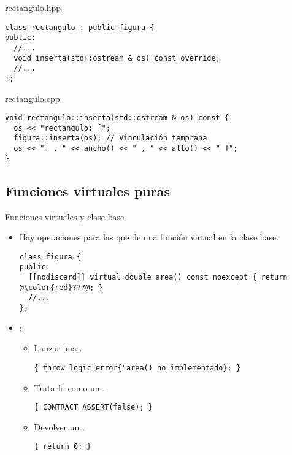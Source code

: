 \begin{frame}[t,fragile]
\begin{block}{rectangulo.hpp}
\begin{lstlisting}
class rectangulo : public figura {
public:
  //...
  void inserta(std::ostream & os) const override;
  //...  
};
\end{lstlisting}
\end{block}

\begin{block}{rectangulo.cpp}
\begin{lstlisting}
void rectangulo::inserta(std::ostream & os) const {
  os << "rectangulo: [";
  figura::inserta(os); // Vinculación temprana
  os << "] , " << ancho() << " , " << alto() << " ]";
}
\end{lstlisting}
\end{block}
\end{frame}

\subsection{Funciones virtuales puras}

\begin{frame}[t,fragile]{Funciones virtuales y clase base} 
\begin{itemize}
  \item Hay operaciones para las que 
        de una función virtual en la clase base.
\begin{lstlisting}[escapechar=@]
class figura {
public:
  [[nodiscard]] virtual double area() const noexcept { return @\color{red}???@; }
  //...
};
\end{lstlisting}

  \item {}:
    \begin{itemize}
      \item Lanzar una .
\begin{lstlisting}
{ throw logic_error{"area() no implementado}; }
\end{lstlisting}

      \item Tratarlo como un .
\begin{lstlisting}
{ CONTRACT_ASSERT(false); }
\end{lstlisting}

      \item Devolver un .
\begin{lstlisting}
{ return 0; }
\end{lstlisting}

    \end{itemize}
\end{itemize}
\end{frame}

